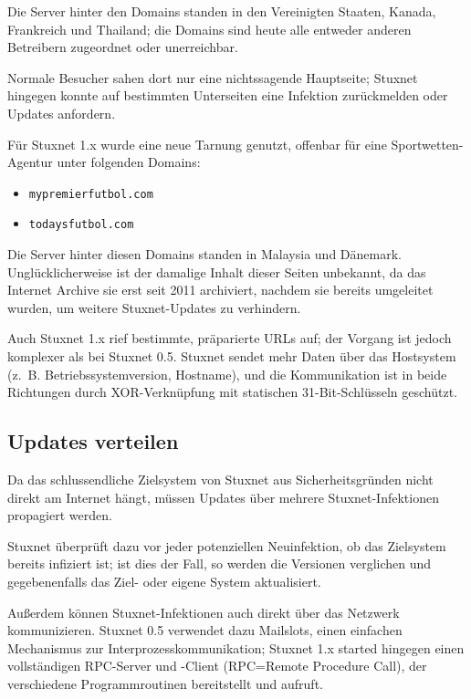 \documentclass[a4paper]{article}
\begin{document}
Die Server hinter den Domains standen in den Vereinigten Staaten, Kanada, Frankreich und Thailand; %
die Domains sind heute alle entweder anderen Betreibern zugeordnet oder unerreichbar.

Normale Besucher sahen dort nur eine nichtssagende Hauptseite\cite{archive_best_advertising};
Stuxnet hingegen konnte auf bestimmten Unterseiten eine Infektion zurückmelden oder Updates anfordern.

Für Stuxnet 1.x wurde eine neue Tarnung genutzt, offenbar für eine Sport\-wet\-ten-Agentur unter folgenden Domains:

\begin{itemize}
\item \texttt{mypremierfutbol.com}
\item \texttt{todaysfutbol.com}
\end{itemize}

Die Server hinter diesen Domains standen in Malaysia und Dänemark.
Un\-glück\-li\-cher\-wei\-se ist der damalige Inhalt dieser Seiten unbekannt,
da das Internet Archive sie erst seit 2011 archiviert,
nachdem sie bereits umgeleitet wurden, um weitere Stuxnet-Updates zu verhindern.

Auch Stuxnet 1.x rief bestimmte, präparierte URLs auf;
der Vorgang ist jedoch komplexer als bei Stuxnet 0.5.
Stuxnet sendet mehr Daten über das Hostsystem (z.~B. Betriebssystemversion, Hostname),
und die Kommunikation ist in beide Richtungen durch XOR-Verknüpfung mit statischen 31-Bit-Schlüsseln geschützt.

\subsection{Updates verteilen}

Da das schlussendliche Zielsystem von Stuxnet aus Sicherheitsgründen nicht direkt am Internet hängt,
müssen Updates über mehrere Stuxnet-Infektionen propagiert werden.

Stuxnet überprüft dazu vor jeder potenziellen Neuinfektion, ob das Zielsystem bereits infiziert ist;
ist dies der Fall, so werden die Versionen verglichen und gegebenenfalls das Ziel- oder eigene System aktualisiert.

Außerdem können Stuxnet-Infektionen auch direkt über das Netzwerk kommunizieren.
Stuxnet 0.5 verwendet dazu Mailslots, einen einfachen Mechanismus zur Interprozesskommunikation;
Stuxnet 1.x started hingegen einen vollständigen RPC-Server und -Client (RPC=Remote Procedure Call), %
der verschiedene Programmroutinen bereitstellt und aufruft.
\end{document}
